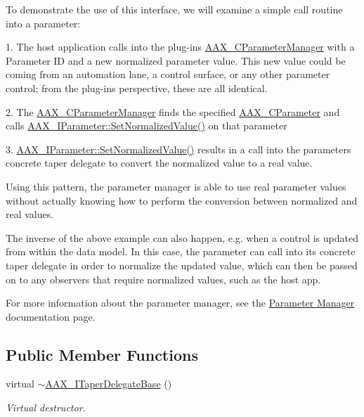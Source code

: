 To demonstrate the use of this interface, we will examine a simple call routine into a parameter\+:

\begin{DoxyParagraph}{}
1. The host application calls into the plug-\/in\textquotesingle{}s \hyperlink{a00034}{A\+A\+X\+\_\+\+C\+Parameter\+Manager} with a Parameter I\+D and a new normalized parameter value. This new value could be coming from an automation lane, a control surface, or any other parameter control; from the plug-\/in\textquotesingle{}s perspective, these are all identical.
\end{DoxyParagraph}
\begin{DoxyParagraph}{}
2. The \hyperlink{a00034}{A\+A\+X\+\_\+\+C\+Parameter\+Manager} finds the specified \hyperlink{a00033}{A\+A\+X\+\_\+\+C\+Parameter} and calls \hyperlink{a00108_ad4b9a53e4e972d1a840ef094036e5a70}{A\+A\+X\+\_\+\+I\+Parameter\+::\+Set\+Normalized\+Value()} on that parameter
\end{DoxyParagraph}
\begin{DoxyParagraph}{}
3. \hyperlink{a00108_ad4b9a53e4e972d1a840ef094036e5a70}{A\+A\+X\+\_\+\+I\+Parameter\+::\+Set\+Normalized\+Value()} results in a call into the parameter\textquotesingle{}s concrete taper delegate to convert the normalized value to a real value.
\end{DoxyParagraph}
Using this pattern, the parameter manager is able to use real parameter values without actually knowing how to perform the conversion between normalized and real values.

The inverse of the above example can also happen, e.\+g. when a control is updated from within the data model. In this case, the parameter can call into its concrete taper delegate in order to normalize the updated value, which can then be passed on to any observers that require normalized values, such as the host app.

For more information about the parameter manager, see the \hyperlink{a00344}{Parameter Manager} documentation page. \subsection*{Public Member Functions}
\begin{DoxyCompactItemize}
\item 
virtual \hyperlink{a00115_a38bf3326334b9bc248c62faff2492d38}{$\sim$\+A\+A\+X\+\_\+\+I\+Taper\+Delegate\+Base} ()
\begin{DoxyCompactList}\small\item\em Virtual destructor. \end{DoxyCompactList}\end{DoxyCompactItemize}


